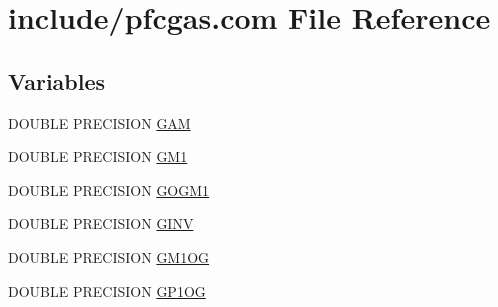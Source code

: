 \hypertarget{pfcgas_8com}{\section{include/pfcgas.com File Reference}
\label{pfcgas_8com}
}
\subsection*{Variables}
\begin{DoxyCompactItemize}
\item 
D\-O\-U\-B\-L\-E P\-R\-E\-C\-I\-S\-I\-O\-N \hyperlink{pfcgas_8com_a1a3451daf1c485e36b8a5c33f7b432c9}{G\-A\-M}
\item 
D\-O\-U\-B\-L\-E P\-R\-E\-C\-I\-S\-I\-O\-N \hyperlink{pfcgas_8com_a6cd8b68ed9e1d13b52b7c4b6de87b1c7}{G\-M1}
\item 
D\-O\-U\-B\-L\-E P\-R\-E\-C\-I\-S\-I\-O\-N \hyperlink{pfcgas_8com_ad60f4356829a6107f5ecf84f7927c34b}{G\-O\-G\-M1}
\item 
D\-O\-U\-B\-L\-E P\-R\-E\-C\-I\-S\-I\-O\-N \hyperlink{pfcgas_8com_ae4bbdc7810f251329ba4e865a20796ec}{G\-I\-N\-V}
\item 
D\-O\-U\-B\-L\-E P\-R\-E\-C\-I\-S\-I\-O\-N \hyperlink{pfcgas_8com_a187acc2efbf381a4da92c8a3cc1902ae}{G\-M1\-O\-G}
\item 
D\-O\-U\-B\-L\-E P\-R\-E\-C\-I\-S\-I\-O\-N \hyperlink{pfcgas_8com_a2d7ad8a7f43069a14c265ff78370b1dd}{G\-P1\-O\-G}
\end{DoxyCompactItemize}



